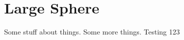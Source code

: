 \chapter{Large Sphere}
\label{LargeSphereChapter}

Some stuff about things.\cite{vienot_verriest_2014} Some more things. 
Testing 123